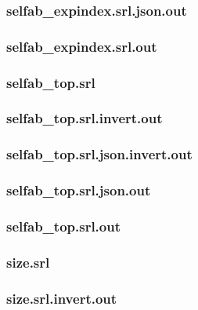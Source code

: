 \subsubsection{selfab\_expindex.srl.json.out}
\label{app:selfab_expindex_srl.json.out}

\subsubsection{selfab\_expindex.srl.out}
\label{app:selfab_expindex_srl.out}

\subsubsection{selfab\_top.srl}
\label{app:selfab_top_srl}

\subsubsection{selfab\_top.srl.invert.out}
\label{app:selfab_top_srl.invert.out}

\subsubsection{selfab\_top.srl.json.invert.out}
\label{app:selfab_top_srl.json.invert.out}

\subsubsection{selfab\_top.srl.json.out}
\label{app:selfab_top_srl.json.out}

\subsubsection{selfab\_top.srl.out}
\label{app:selfab_top_srl.out}

\subsubsection{size.srl}
\label{app:size_srl}

\subsubsection{size.srl.invert.out}
\label{app:size_srl.invert.out}


